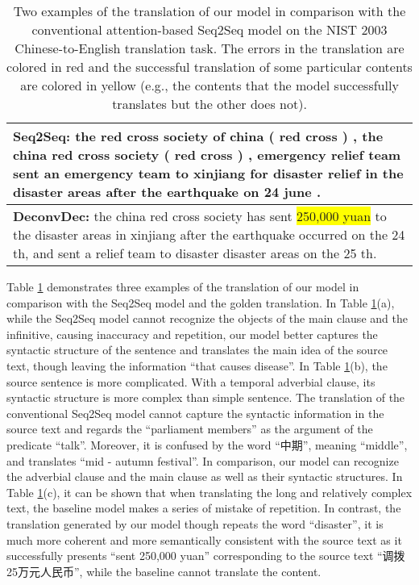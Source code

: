 \documentclass[11pt]{article}
\begin{document}
\begin{CJK}{UTF8}{gbsn}
\begin{table}[t]
{\begin{tabular}{p{15.5cm}}
    \hline
        \textbf{Seq2Seq:} \colorbox[rgb]{0.99,0.86,0.86}{the red cross society of china ( red cross ) , the china red cross society ( red cross )} , \colorbox[rgb]{0.99,0.86,0.86}{emergency} relief team sent an \colorbox[rgb]{0.99,0.86,0.86}{emergency} team to xinjiang for disaster relief in the disaster areas after the earthquake on 24 \colorbox[rgb]{0.99,0.86,0.86}{june} .\\
    \hline
    \textbf{DeconvDec:} the china red cross society has sent \colorbox{yellow}{250,000 yuan} to the disaster areas in xinjiang after the earthquake occurred on the 24 th, and sent a relief team to \colorbox[rgb]{0.99,0.86,0.86}{disaster disaster} areas on the 25 th.
\\
    \hline  
    \end{tabular}}
    \caption{Two examples of the translation of our model in comparison with the conventional attention-based Seq2Seq model on the NIST 2003 Chinese-to-English translation task. The errors in the translation are colored in red and the successful translation of some particular contents are colored in yellow (e.g., the contents that the model successfully translates but the other does not).}
    \label{example}
\end{table}
Table \ref{example} demonstrates three examples of the translation of our model in comparison with the Seq2Seq model and the golden translation. In Table \ref{example}(a), while the Seq2Seq model cannot recognize the objects of the main clause and the infinitive, causing inaccuracy and repetition, our model better captures the syntactic structure of the sentence and translates the main idea of the source text, though leaving the information ``that causes disease''. In Table \ref{example}(b), the source sentence is more complicated. With a temporal adverbial clause, its syntactic structure is more complex than simple sentence. The translation of the conventional Seq2Seq model cannot capture the syntactic information in the source text and regards the ``parliament members'' as the argument of the predicate ``talk''. Moreover, it is confused by the word ``中期'', meaning ``middle'', and translates ``mid - autumn festival''. In comparison, our model can recognize the adverbial clause and the main clause as well as their syntactic structures. In Table \ref{example}(c), it can be shown that when translating the long and relatively complex text, the baseline model makes a series of mistake of repetition. In contrast, the translation generated by our model though repeats the word ``disaster'', it is much more coherent and more semantically consistent with the source text as it successfully presents ``sent 250,000 yuan'' corresponding to the source text ``调拨25万元人民币'', while the baseline cannot translate the content. 


\end{CJK}
\end{document}
